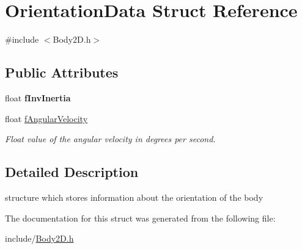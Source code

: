 \hypertarget{struct_orientation_data}{\section{Orientation\+Data Struct Reference}
\label{struct_orientation_data}
}


{\ttfamily \#include $<$Body2\+D.\+h$>$}

\subsection*{Public Attributes}
\begin{DoxyCompactItemize}
\item 
\hypertarget{struct_orientation_data_a9cb40c50a44caeaaa0aa3f29fa867c11}{float {\bfseries f\+Inv\+Inertia}}\label{struct_orientation_data_a9cb40c50a44caeaaa0aa3f29fa867c11}

\item 
\hypertarget{struct_orientation_data_a6c9041628d19999662eebcc8bcfeff34}{float \hyperlink{struct_orientation_data_a6c9041628d19999662eebcc8bcfeff34}{f\+Angular\+Velocity}}\label{struct_orientation_data_a6c9041628d19999662eebcc8bcfeff34}

\begin{DoxyCompactList}\small\item\em Float value of the angular velocity in degrees per second. \end{DoxyCompactList}\end{DoxyCompactItemize}


\subsection{Detailed Description}
structure which stores information about the orientation of the body 

The documentation for this struct was generated from the following file\+:\begin{DoxyCompactItemize}
\item 
include/\hyperlink{_body2_d_8h}{Body2\+D.\+h}\end{DoxyCompactItemize}
